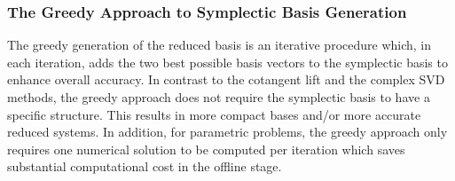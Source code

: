 \subsubsection{The Greedy Approach to Symplectic Basis Generation} The greedy generation of the reduced basis is an iterative procedure which, in each iteration, adds the two best possible basis vectors to the symplectic basis to enhance overall accuracy. In contrast to the cotangent lift and the complex SVD methods, the greedy approach does not require the symplectic basis to have a specific structure. This results in more compact bases and/or more accurate reduced systems. In addition, for parametric problems, the greedy approach only requires one numerical solution to be computed per iteration which saves substantial computational cost in the offline stage. 

